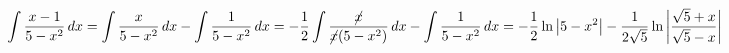 \documentclass[../rgr1.tex]{subfiles}
\begin{document}
\Solution

\begin{dmath}
	\int \frac{x-1}{5-x^2} \, dx =
	\int \frac{x}{5-x^2} \, dx -
	\int \frac{1}{5-x^2} \, dx =
	-\frac{1}{2}\int\frac{\cancel x}{\cancel x (5-x^2)} \, dx -
	\int \frac{1}{5-x^2} \, dx =
	-\frac{1}{2}\ln\left|5-x^2\right| -
	\frac{1}{2\sqrt5}\ln\left|\frac{\sqrt5+x}{\sqrt5-x}\right|
\end{dmath}

\end{document}
